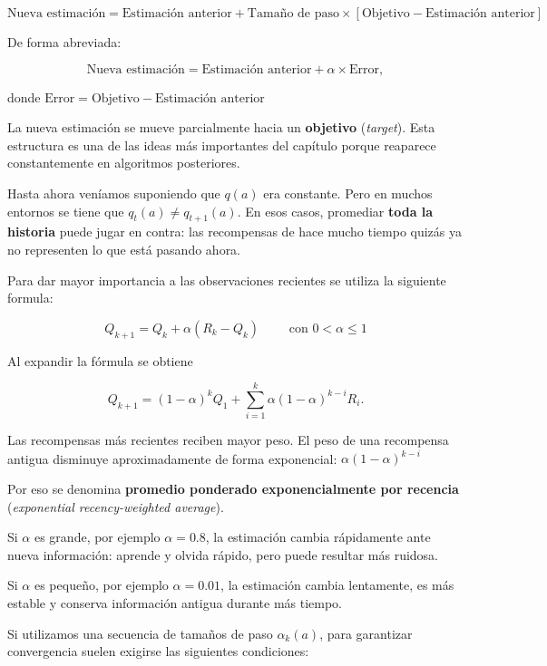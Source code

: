 \documentclass[11pt,a4paper]{article}
\begin{document}
\[
  \boxed{
  \text{Nueva estimación}
  =\text{Estimación anterior}
  +\text{Tamaño de paso} \times
  \left[\text{Objetivo}-\text{Estimación anterior}\right]
  }.
\]

De forma abreviada:

\[
  \boxed{
  \text{Nueva estimación}
  =\text{Estimación anterior}+\alpha\times\text{Error}
  },
\]

donde $\text{Error}=\text{Objetivo}-\text{Estimación anterior}$

La nueva estimación se mueve parcialmente hacia un \textbf{objetivo}
(\textit{target}). Esta estructura es una de las ideas más importantes del
capítulo porque reaparece constantemente en algoritmos posteriores.

Hasta ahora veníamos suponiendo que $q(a)$ era constante. Pero en muchos entornos se tiene que $q_t(a)\neq q_{t+1}(a)$. En esos casos, promediar \textbf{toda la historia} puede jugar en contra: las recompensas de hace mucho tiempo quizás ya no representen lo que está pasando
ahora.

Para dar mayor importancia a las observaciones recientes se utiliza la siguiente formula: 

\begin{equation}
    \boxed{Q_{k+1}=Q_k+\alpha\left(R_k-Q_k\right)}
    \qquad \text{ con } 0<\alpha\leq 1
\end{equation}
  
Al expandir la fórmula se obtiene

\begin{equation}
    Q_{k+1}=(1-\alpha)^kQ_1
  +\sum_{i=1}^{k}\alpha(1-\alpha)^{k-i}R_i.
\end{equation}

Las recompensas más recientes reciben mayor peso. El peso de una recompensa
antigua disminuye aproximadamente de forma exponencial: $\alpha(1-\alpha)^{k-i}$

Por eso se denomina \textbf{promedio ponderado exponencialmente por recencia}
(\textit{exponential recency-weighted average}).

Si $\alpha$ es grande, por ejemplo $\alpha=0.8$, la estimación cambia
rápidamente ante nueva información: aprende y olvida rápido, pero puede resultar
más ruidosa.

Si $\alpha$ es pequeño, por ejemplo $\alpha=0.01$, la estimación cambia
lentamente, es más estable y conserva información antigua durante más tiempo.

Si utilizamos una secuencia de tamaños de paso $\alpha_k(a)$, para garantizar
convergencia suelen exigirse las siguientes condiciones:
\end{document}
